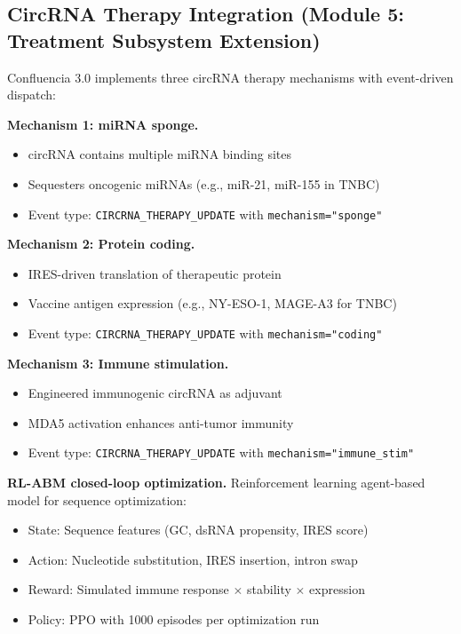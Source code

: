 \documentclass[12pt]{article}
\begin{document}
\subsection{CircRNA Therapy Integration (Module 5: Treatment Subsystem Extension)}

Confluencia 3.0 implements three circRNA therapy mechanisms with event-driven dispatch:

\textbf{Mechanism 1: miRNA sponge.}
\begin{itemize}
\item circRNA contains multiple miRNA binding sites
\item Sequesters oncogenic miRNAs (e.g., miR-21, miR-155 in TNBC)
\item Event type: \texttt{CIRCRNA\_THERAPY\_UPDATE} with \texttt{mechanism="sponge"}
\end{itemize}

\textbf{Mechanism 2: Protein coding.}
\begin{itemize}
\item IRES-driven translation of therapeutic protein
\item Vaccine antigen expression (e.g., NY-ESO-1, MAGE-A3 for TNBC)
\item Event type: \texttt{CIRCRNA\_THERAPY\_UPDATE} with \texttt{mechanism="coding"}
\end{itemize}

\textbf{Mechanism 3: Immune stimulation.}
\begin{itemize}
\item Engineered immunogenic circRNA as adjuvant
\item MDA5 activation enhances anti-tumor immunity
\item Event type: \texttt{CIRCRNA\_THERAPY\_UPDATE} with \texttt{mechanism="immune\_stim"}
\end{itemize}

\textbf{RL-ABM closed-loop optimization.} Reinforcement learning agent-based model for sequence optimization:
\begin{itemize}
\item State: Sequence features (GC, dsRNA propensity, IRES score)
\item Action: Nucleotide substitution, IRES insertion, intron swap
\item Reward: Simulated immune response $\times$ stability $\times$ expression
\item Policy: PPO with 1000 episodes per optimization run
\end{itemize}
\end{document}
